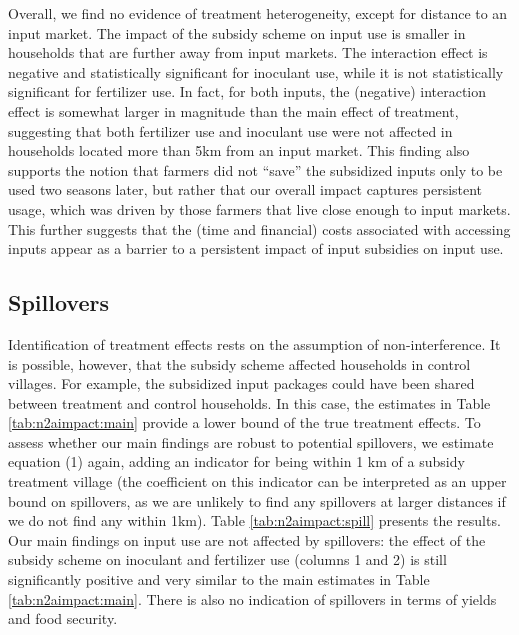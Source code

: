 Overall, we find no evidence of treatment heterogeneity, except for distance to an input market. The impact of the subsidy scheme on input use is smaller in households that are further away from input markets. The interaction effect is negative and statistically significant for inoculant use, while it is not statistically significant for fertilizer use. In fact, for both inputs, the (negative) interaction effect is somewhat larger in magnitude than the main effect of treatment, suggesting that both fertilizer use and inoculant use were not affected in households located more than 5km from an input market. This finding also supports the notion that farmers did not “save” the subsidized inputs only to be used two seasons later, but rather that our overall impact captures persistent usage, which was driven by those farmers that live close enough to input markets. This further suggests that the (time and financial) costs associated with accessing inputs appear as a barrier to a persistent impact of input subsidies on input use. 

\subsection{Spillovers}
Identification of treatment effects rests on the assumption of non-interference. It is possible, however, that the subsidy scheme affected households in control villages. For example, the subsidized input packages could have been shared between treatment and control households. In this case, the estimates in Table \ref{tab:n2aimpact:main} provide a lower bound of the true treatment effects. To assess whether our main findings are robust to potential spillovers, we estimate equation (1) again, adding an indicator for being within 1 km of a subsidy treatment village (the coefficient on this indicator can be interpreted as an upper bound on spillovers, as we are unlikely to find any spillovers at larger distances if we do not find any within 1km). Table \ref{tab:n2aimpact:spill} presents the results. Our main findings on input use are not affected by spillovers: the effect of the subsidy scheme on inoculant and fertilizer use (columns 1 and 2) is still significantly positive and very similar to the main estimates in Table \ref{tab:n2aimpact:main}. There is also no indication of spillovers in terms of yields and food security.

